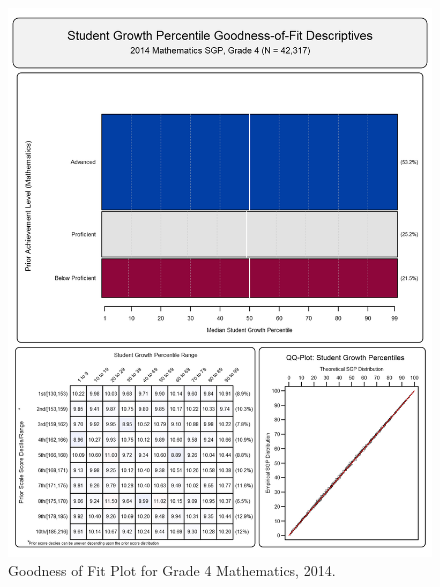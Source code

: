 \documentclass[12pt]{article}
\begin{document}
\begin{figure}[htbp]
\centering
\includegraphics{../img/Goodness_of_Fit/MATHEMATICS.2014/2014_MATH_4;2013_MATH_3.png}
\caption{Goodness of Fit Plot for Grade 4 Mathematics, 2014.}
\end{figure}
\end{document}
